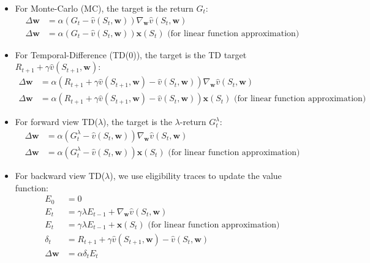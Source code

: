 \begin{itemize}
    \item For Monte-Carlo (MC), the target is the return $G_t$:
          \begin{align*}
              \Delta \mathbf{w} & = \alpha (G_t - \hat{v}(S_t, \mathbf{w})) \nabla_\mathbf{w} \hat{v}(S_t, \mathbf{w})                  \\
              \Delta \mathbf{w} & = \alpha (G_t - \hat{v}(S_t, \mathbf{w})) \mathbf{x}(S_t) \text{ (for linear function approximation)}
          \end{align*}
    \item For Temporal-Difference (TD(0)), the target is the TD target $R_{t+1} + \gamma
              \hat{v}(S_{t+1}, \mathbf{w})$:
          \begin{align*}
              \Delta \mathbf{w} & = \alpha (R_{t+1} + \gamma \hat{v}(S_{t+1}, \mathbf{w}) - \hat{v}(S_t, \mathbf{w})) \nabla_\mathbf{w} \hat{v}(S_t, \mathbf{w})                  \\
              \Delta \mathbf{w} & = \alpha (R_{t+1} + \gamma \hat{v}(S_{t+1}, \mathbf{w}) - \hat{v}(S_t, \mathbf{w})) \mathbf{x}(S_t) \text{ (for linear function approximation)}
          \end{align*}
    \item For forward view TD($\lambda$), the target is the $\lambda$-return
          $G_t^\lambda$:
          \begin{align*}
              \Delta \mathbf{w} & = \alpha (G_t^\lambda - \hat{v}(S_t, \mathbf{w})) \nabla_\mathbf{w} \hat{v}(S_t, \mathbf{w})                  \\
              \Delta \mathbf{w} & = \alpha (G_t^\lambda - \hat{v}(S_t, \mathbf{w})) \mathbf{x}(S_t) \text{ (for linear function approximation)}
          \end{align*}
    \item For backward view TD($\lambda$), we use eligibility traces to update the value
          function:
          \begin{align*}
              E_0               & = 0                                                                                    \\
              E_t               & = \gamma \lambda E_{t-1} + \nabla_\mathbf{w} \hat{v}(S_t, \mathbf{w})                  \\
              E_t               & = \gamma \lambda E_{t-1} + \mathbf{x}(S_t) \text{ (for linear function approximation)} \\
              \delta_t          & = R_{t+1} + \gamma \hat{v}(S_{t+1}, \mathbf{w}) - \hat{v}(S_t, \mathbf{w})             \\
              \Delta \mathbf{w} & = \alpha \delta_t E_t
          \end{align*}
\end{itemize}

